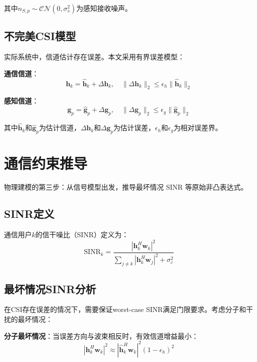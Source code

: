 \documentclass[12pt,a4paper]{article}
\newcommand{\vect}[1]{\mathbf{#1}}
\newcommand{\norm}[1]{\|#1\|_2}
\begin{document}
其中$n_{S,p} \sim \mathcal{CN}(0, \sigma_s^2)$为感知接收噪声。

\subsection{不完美CSI模型}

实际系统中，信道估计存在误差。本文采用有界误差模型：

\textbf{通信信道}：
\begin{equation}
\vect{h}_k = \hat{\vect{h}}_k + \Delta\vect{h}_k, \quad \norm{\Delta\vect{h}_k} \leq \epsilon_h \norm{\hat{\vect{h}}_k}
\end{equation}

\textbf{感知信道}：
\begin{equation}
\vect{g}_p = \hat{\vect{g}}_p + \Delta\vect{g}_p, \quad \norm{\Delta\vect{g}_p} \leq \epsilon_g \norm{\hat{\vect{g}}_p}
\end{equation}

其中$\hat{\vect{h}}_k$和$\hat{\vect{g}}_p$为估计信道，$\Delta\vect{h}_k$和$\Delta\vect{g}_p$为估计误差，$\epsilon_h$和$\epsilon_g$为相对误差界。

\section{通信约束推导}

物理建模的第三步：从信号模型出发，推导最坏情况 SINR 等原始非凸表达式。

\subsection{SINR定义}

通信用户$k$的信干噪比（SINR）定义为：
\begin{equation}
\text{SINR}_k = \frac{|\vect{h}_k^H \vect{w}_k|^2}{\sum_{j \neq k} |\vect{h}_k^H \vect{w}_j|^2 + \sigma_c^2} \tag{1}
\end{equation}

\subsection{最坏情况SINR分析}

在CSI存在误差的情况下，需要保证worst-case SINR满足门限要求。考虑分子和干扰的最坏情况：

\textbf{分子最坏情况}：当误差方向与波束相反时，有效信道增益最小：
\begin{equation}
|\vect{h}_k^H \vect{w}_k|^2 \approx |\hat{\vect{h}}_k^H \vect{w}_k|^2 (1 - \epsilon_h)^2
\end{equation}
\end{document}
